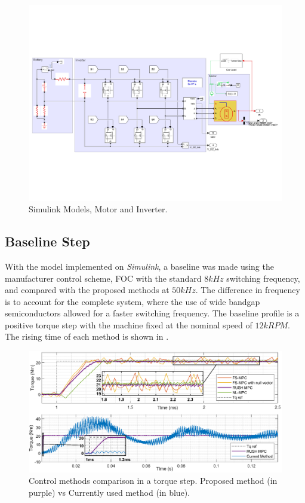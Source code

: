 \documentclass[9pt,conference]{IEEEtran}
\begin{document}
\begin{figure}[!htb]
	\centering
		\includegraphics[clip, trim=0.3cm 5cm 0.5cm 5cm, width=.8\linewidth]{Figures/motor_and_inverter_simulink1.pdf}
	\caption[Simulink Models, Motor and Inverter.]{Simulink Models, Motor and Inverter.}
	\label{fig:simulation_model} %
\end{figure}

\subsection{Baseline Step}
With the model implemented on \textit{Simulink}, a baseline was made using the manufacturer control scheme, FOC with the standard $8kHz$ switching frequency, and compared with the proposed methods at $50kHz$. The difference in frequency is to account for the complete system, where the use of wide bandgap semiconductors allowed for a faster switching frequency. The baseline profile is a positive torque step with the machine fixed at the nominal speed of $12kRPM$. The rising time of each method is shown in .
\begin{figure}[!htb]
	\centering
    \includegraphics[clip, trim=0cm 0cm 0cm 5.5cm,width=.8\linewidth]{Figures/Step_@12000RPM.eps}
	\caption[Control methods comparison in a torque step.]{Control methods comparison in a torque step. Proposed method (in purple) vs Currently used method (in blue).}
	\label{fig:rising_time_4_models} %
\end{figure}
\end{document}
